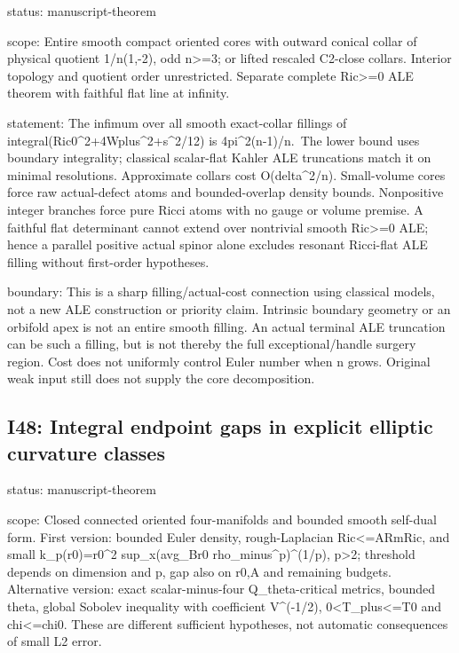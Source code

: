\documentclass[
  10pt,
]{article}
\begin{document}
status: manuscript-theorem

scope: Entire smooth compact oriented cores with outward conical collar
of physical quotient 1/n(1,-2), odd n\textgreater=3; or lifted rescaled
C2-close collars. Interior topology and quotient order unrestricted.
Separate complete Ric\textgreater=0 ALE theorem with faithful flat line
at infinity.

statement: The infimum over all smooth exact-collar fillings of
integral(Ric0\^{}2+4Wplus\^{}2+s\^{}2/12) is 4pi\^{}2(n-1)/n.~The lower
bound uses boundary integrality; classical scalar-flat Kahler ALE
truncations match it on minimal resolutions. Approximate collars cost
O(delta\^{}2/n). Small-volume cores force raw actual-defect atoms and
bounded-overlap density bounds. Nonpositive integer branches force pure
Ricci atoms with no gauge or volume premise. A faithful flat determinant
cannot extend over nontrivial smooth Ric\textgreater=0 ALE; hence a
parallel positive actual spinor alone excludes resonant Ricci-flat ALE
filling without first-order hypotheses.

boundary: This is a sharp filling/actual-cost connection using classical
models, not a new ALE construction or priority claim. Intrinsic boundary
geometry or an orbifold apex is not an entire smooth filling. An actual
terminal ALE truncation can be such a filling, but is not thereby the
full exceptional/handle surgery region. Cost does not uniformly control
Euler number when n grows. Original weak input still does not supply the
core decomposition.

\hypertarget{i48-integral-endpoint-gaps-in-explicit-elliptic-curvature-classes}{%
\subsection{I48: Integral endpoint gaps in explicit elliptic curvature
classes}\label{i48-integral-endpoint-gaps-in-explicit-elliptic-curvature-classes}}

status: manuscript-theorem

scope: Closed connected oriented four-manifolds and bounded smooth
self-dual form. First version: bounded Euler density,
\textbar rough-Laplacian
Ric\textbar\textless=A\textbar Rm\textbar\textbar Ric\textbar, and small
k\_p(r0)=r0\^{}2 sup\_x(avg\_Br0 rho\_minus\^{}p)\^{}(1/p),
p\textgreater2; threshold depends on dimension and p, gap also on r0,A
and remaining budgets. Alternative version: exact scalar-minus-four
Q\_theta-critical metrics, bounded theta, global Sobolev inequality with
coefficient V\^{}(-1/2), 0\textless T\_plus\textless=T0 and
chi\textless=chi0. These are different sufficient hypotheses, not
automatic consequences of small L2 error.
\end{document}
